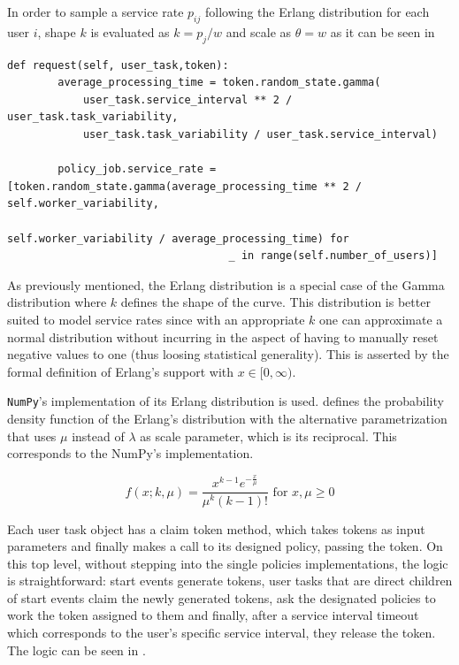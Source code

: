 \documentclass{seal_thesis}
\begin{document}
In order to sample a service rate $p_{ij}$ following the Erlang distribution for each user $i$, shape $k$ is evaluated as $k=p_j/w$ and scale as $\theta = w$ as it can be seen in 



\begin{lstlisting}[caption=User service rate sampling following an Erlang distribution,label=lst:user_service_rate,style=CustomPython]
    def request(self, user_task,token):
        average_processing_time = token.random_state.gamma(
            user_task.service_interval ** 2 / user_task.task_variability,
            user_task.task_variability / user_task.service_interval)

        policy_job.service_rate = [token.random_state.gamma(average_processing_time ** 2 / self.worker_variability,
                                                           self.worker_variability / average_processing_time) for
                                   _ in range(self.number_of_users)]
\end{lstlisting}

As previously mentioned, the Erlang distribution is a special case of the Gamma distribution where $k$ defines the shape of the curve. This distribution is better suited to model service rates since with an appropriate $k$ one can approximate a normal distribution without incurring in the aspect of having to manually reset negative values to one (thus loosing statistical generality). This is asserted by the formal definition of Erlang's support with $x \in [0,\infty)$.

\texttt{NumPy}'s implementation of its Erlang distribution is used.  defines the probability density function of the Erlang's distribution with the alternative parametrization that uses $\mu$ instead of $\lambda$ as scale parameter, which is its reciprocal. This corresponds to the NumPy's implementation.

\begin{equation}
\label{eq:erlang_density}
	f(x;k,\mu) = \frac{x^{k-1} e^{-\frac{x}{\mu}}}{\mu^k (k-1)!} \text{ for } x,\mu \geq 0
\end{equation}

Each user task object has a claim token method, which takes tokens as input parameters and finally makes a call to its designed policy, passing the token. On this top level, without stepping into the single policies implementations, the logic is straightforward: start events generate tokens, user tasks that are direct children of start events claim the newly generated tokens, ask the designated policies to work the token assigned to them and finally, after a service interval timeout which corresponds to the user's specific service interval, they release the token. The logic can be seen in .
\end{document}
